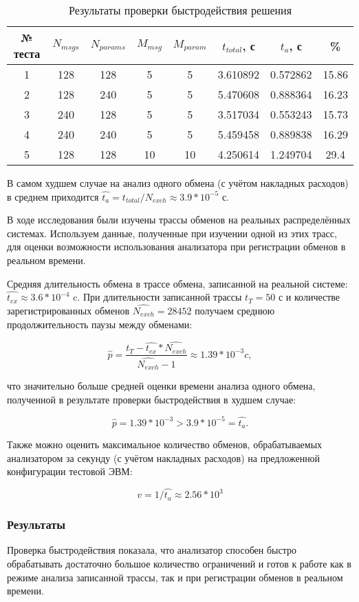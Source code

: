 \begin{table}[H]
 \centering
 \begin{tabular}{|c|*{7}{c|}}
  \hline
  № теста & $N_{msgs}$ & $N_{params}$ & $M_{msg}$ & $M_{param}$ & $t_{total}$, 
с & $t_{a}$, с & \% \\
  \hline
  1 & 128 & 128 & 5   & 5   & 3.610892 & 0.572862 & 15.86 \\
  2 & 128 & 240 & 5   & 5   & 5.470608 & 0.888364 & 16.23 \\
  3 & 240 & 128 & 5   & 5   & 3.517034 & 0.553243 & 15.73 \\
  4 & 240 & 240 & 5   & 5   & 5.459458 & 0.889838 & 16.29 \\
  5 & 128 & 128 & 10 & 10 & 4.250614 & 1.249704 & 29.4 \\
  \hline
 \end{tabular}
 \caption{Результаты проверки быстродействия решения}
 \label{tab:prof}
\end{table}

В самом худшем случае на анализ одного обмена (с учётом накладных расходов) в 
среднем приходится $\hat{t_{a}} = t_{total} / N_{exch} \approx 3.9 * 10^{-5}$ 
с. 

В ходе исследования были изучены трассы обменов на реальных распределённых 
системах. Используем данные, полученные при изучении одной из этих трасс, для 
оценки возможности использования анализатора при регистрации обменов в реальном 
времени.

Средняя длительность обмена в трассе обмена, записанной на реальной системе: 
$\hat{t_{ex}} \approx 3.6 * 10^{-4}$ c. При длительности записанной трассы 
$t_{T} = 50$ с и количестве зарегистрированных обменов $\hat{N_{exch}} = 28452$ 
получаем среднюю продолжительность паузы между обменами:

$$
\hat{p} = \frac{t_{T} - \hat{t_{ex}} * \hat{N_{exch}}}{\hat{N_{exch}} - 1} 
\approx 1.39 * 10^{-3} c,
$$

что значительно больше средней оценки времени анализа одного обмена, полученной 
в результате проверки быстродействия в худшем случае:

$$
\hat{p} = 1.39 * 10^{-3} > 3.9 * 10^{-5} = \hat{t_{a}}.
$$

Также можно оценить максимальное количество обменов, обрабатываемых 
анализатором за секунду (с учётом накладных расходов) на предложенной 
конфигурации тестовой ЭВМ:

$$
v = 1 / \hat{t_{a}} \approx 2.56 * 10^{3}
$$

\subsubsection{Результаты}

Проверка быстродействия показала, что анализатор способен быстро обрабатывать 
достаточно большое количество ограничений и готов к работе как в режиме анализа 
записанной трассы, так и при регистрации обменов в реальном времени.